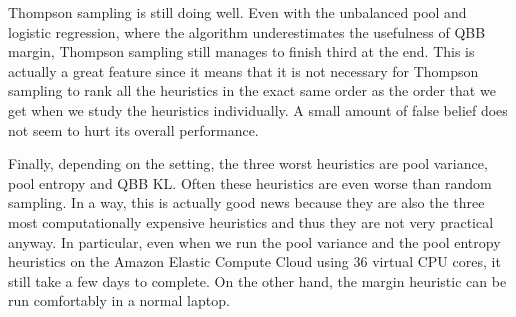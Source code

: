 Thompson sampling is still doing well. Even with the unbalanced pool and logistic regression, where
the algorithm underestimates the usefulness of QBB margin, Thompson sampling still manages to
finish third at the end. This is actually a great feature since it means that it is not necessary
for Thompson sampling to rank all the heuristics in the exact same order as the order that we get
when we study the heuristics individually. A small amount of false belief does not seem to hurt its
overall performance.

Finally, depending on the setting, the three worst heuristics are pool variance, pool entropy and
QBB KL. Often these heuristics are even worse than random sampling. In a way, this is actually good
news because they are also the three most computationally expensive heuristics and thus they are
not very practical anyway. In particular, even when we run the pool variance and the pool entropy
heuristics on the Amazon Elastic Compute Cloud using 36 virtual CPU cores, it still take a few days
to complete. On the other hand, the margin heuristic can be run comfortably in a normal laptop.



